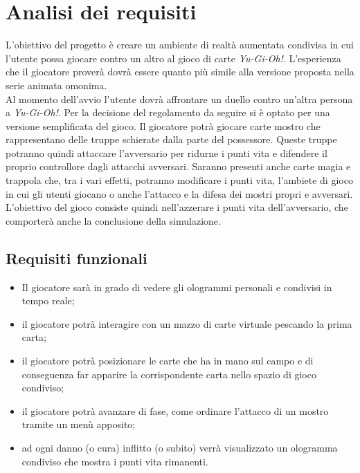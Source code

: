 \section{Analisi dei requisiti}\label{sec:Analisi}
    L'obiettivo del progetto è creare un ambiente di realtà aumentata condivisa
    in cui l'utente possa giocare contro un altro al gioco di carte \textit{Yu-Gi-Oh!}. L'esperienza che il giocatore proverà dovrà essere quanto più simile alla versione
    proposta nella serie animata omonima.\\
    \newline
    Al momento dell'avvio l'utente dovrà affrontare un duello contro un'altra persona a \textit{Yu-Gi-Oh!}. Per la decisione del regolamento da seguire si è optato per
    una versione semplificata del gioco. Il giocatore potrà giocare carte mostro che
    rappresentano delle truppe schierate dalla parte del possessore. Queste truppe
    potranno quindi attaccare l'avversario per ridurne i punti vita e difendere il proprio controllore dagli attacchi avversari. Saranno presenti anche carte magia e trappola che,
    tra i vari effetti, potranno modificare i punti vita, l'ambiete di gioco in cui gli utenti giocano o anche l'attacco e
    la difesa dei mostri propri e avversari. L'obiettivo del gioco consiste quindi
    nell'azzerare i punti vita dell'avversario, che comporterà anche la conclusione della
    simulazione.

    \subsection{Requisiti funzionali}\label{subsec:requisitiFunzionali}
        \begin{itemize}
            \item Il giocatore sarà in grado di vedere gli ologrammi personali e condivisi in tempo reale;
            \item il giocatore potrà interagire con un mazzo di carte virtuale pescando la prima carta;
            \item il giocatore potrà posizionare le carte che ha in mano sul campo e di conseguenza far apparire la corrispondente carta nello spazio di gioco condiviso;
            \item il giocatore potrà avanzare di fase, come ordinare l'attacco di un mostro tramite un menù apposito;
            \item ad ogni danno (o cura) inflitto (o subito) verrà visualizzato un ologramma condiviso che mostra i punti vita rimanenti.
        \end{itemize}
